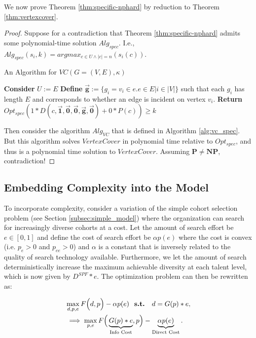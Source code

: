 We now prove Theorem \ref{thm:specific-nphard} by reduction to Theorem \ref{thm:vertexcover}.

\begin{proof}
Suppose for a contradiction that Theorem \ref{thm:specific-nphard} admits some polynomial-time solution $Alg_{spec}$. I.e., $Alg_{spec}(s_i, k )= argmax_{c \in U \land |c| = n}(s_i(c))$.

\begin{algorithm}
    \caption{An Algorithm for $VC(G = (V,E), \kappa)$}\label{alg:vc_spec}
    \begin{algorithmic}
        \State \textbf{Consider} $U := E$
        \State \textbf{Define} $\vec{\mathbf{g}} := \{g_i = v_i \in e . e \in E | i \in |V|\}$ such that each $g_i$ has length $E$ and corresponds to whether an edge is incident on vertex $v_i$.
        \State \textbf{Return} $Opt_{spec}(1*D(c, \vec{\mathbf{1}}, \vec{\mathbf{0}}, \vec{\mathbf{0}}, \vec{\mathbf{g}}, \vec{\mathbf{0}})+ 0*P(c)) \geq k$
    \end{algorithmic}
\end{algorithm}

Then consider the algorithm $Alg_{VC}$ that is defined in Algorithm \ref{alg:vc_spec}. But this algorithm solves $VertexCover$ in polynomial time relative to $Opt_{spec}$, and thus is a polynomial time solution to $VertexCover$. Assuming $\mathbf{P} \neq \mathbf{NP}$, contradiction!
\end{proof}

\subsection{Embedding Complexity into the Model}\label{subsec:dts_w_complexity}

To incorporate complexity, consider a variation of the simple cohort selection problem (see Section \ref{subsec:simple_model}) where the organization can search for increasingly diverse cohorts at a cost. Let the amount of search effort be $e\in[0,1]$ and define the cost of search effort be $\alpha p(e)$ where the cost is convex (i.e. $p_e>0$ and $p_{ee}>0$) and $\alpha$ is a constant that is inversely related to the quality of search technology available. Furthermore, we let the amount of search deterministically increase the maximum achievable diversity at each talent level, which is now given by $D^{SPF}*e$. The optimization problem can then be rewritten as:

\begin{align}
&\max_{d,p,e} F\Big(d,p\Big) - \alpha p(e) \text{ \bf{ s.t. } } d = G(p)*e, \nonumber \\ 
& \implies \max_{p,e} F\Big(\underbrace{G(p)*e}_{\text{Info Cost}} ,p\Big) - \underbrace{\alpha p(e)}_{\text{Direct Cost}}. \label{eq:objective}
\end{align}

